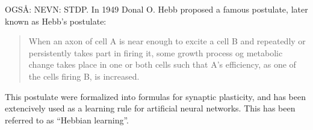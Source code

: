 OGSÅ: NEVN: STDP.
In 1949 Donal O. Hebb proposed a famous postulate, later known as Hebb's postulate:
\begin{quote}
When an axon of cell A is near enough to excite a cell B and repeatedly or persistently takes part in firing it, some growth process og metabolic change takes place in one or both cells such that A's efficiency, as one of the cells firing B, is increased.\cite{Hebb1949Kap4}
\end{quote}

This postulate were formalized into formulas for synaptic plasticity, and has been extencively used as a learning rule for artificial neural networks.
This has been referred to as ``Hebbian learning''\cite{HaykinANNbok}.








